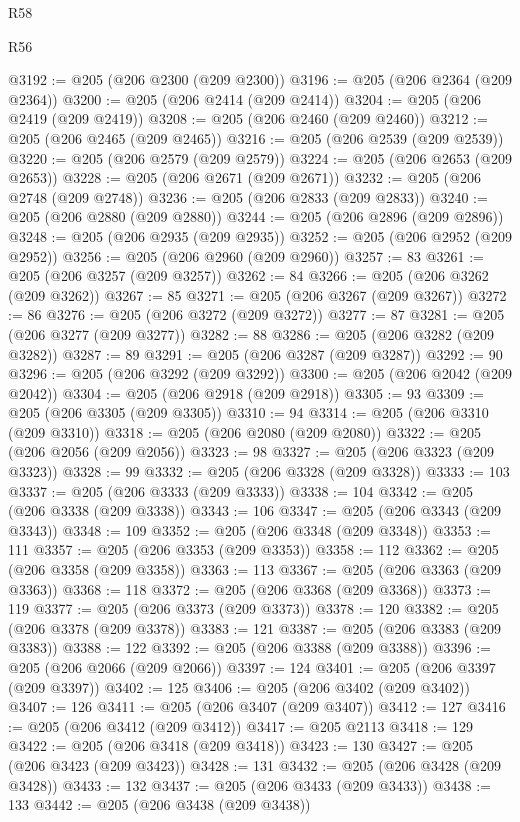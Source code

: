 \begin{lexlean}{R58}
\begin{lexlean}{R56}
\begin{coremodule}
{{{{{{{{{{{{{{{{{{{{{{{{{{{{{{{{{{{{{{{{{{{{{{{{{{{{{{{{{{{{{{{{{{{{{{{{{{{{{{{{{{{{{{{{{{{{{{{{{{{{{{{{{{{{{{{{{{{{{{{{{{{{{{{{{{{{{{{{{{{{{{{{{{{{{{{{{{{{{{{{{{{{{{{{{{{{{{{{{{{{{{{{{{{{{{{{{{{{{{{{{{{{{{{{{{{@3192 := @205 (@206 @2300 (@209 @2300))
@3196 := @205 (@206 @2364 (@209 @2364))
@3200 := @205 (@206 @2414 (@209 @2414))
@3204 := @205 (@206 @2419 (@209 @2419))
@3208 := @205 (@206 @2460 (@209 @2460))
@3212 := @205 (@206 @2465 (@209 @2465))
@3216 := @205 (@206 @2539 (@209 @2539))
@3220 := @205 (@206 @2579 (@209 @2579))
@3224 := @205 (@206 @2653 (@209 @2653))
@3228 := @205 (@206 @2671 (@209 @2671))
@3232 := @205 (@206 @2748 (@209 @2748))
@3236 := @205 (@206 @2833 (@209 @2833))
@3240 := @205 (@206 @2880 (@209 @2880))
@3244 := @205 (@206 @2896 (@209 @2896))
@3248 := @205 (@206 @2935 (@209 @2935))
@3252 := @205 (@206 @2952 (@209 @2952))
@3256 := @205 (@206 @2960 (@209 @2960))
@3257 := 83
@3261 := @205 (@206 @3257 (@209 @3257))
@3262 := 84
@3266 := @205 (@206 @3262 (@209 @3262))
@3267 := 85
@3271 := @205 (@206 @3267 (@209 @3267))
@3272 := 86
@3276 := @205 (@206 @3272 (@209 @3272))
@3277 := 87
@3281 := @205 (@206 @3277 (@209 @3277))
@3282 := 88
@3286 := @205 (@206 @3282 (@209 @3282))
@3287 := 89
@3291 := @205 (@206 @3287 (@209 @3287))
@3292 := 90
@3296 := @205 (@206 @3292 (@209 @3292))
@3300 := @205 (@206 @2042 (@209 @2042))
@3304 := @205 (@206 @2918 (@209 @2918))
@3305 := 93
@3309 := @205 (@206 @3305 (@209 @3305))
@3310 := 94
@3314 := @205 (@206 @3310 (@209 @3310))
@3318 := @205 (@206 @2080 (@209 @2080))
@3322 := @205 (@206 @2056 (@209 @2056))
@3323 := 98
@3327 := @205 (@206 @3323 (@209 @3323))
@3328 := 99
@3332 := @205 (@206 @3328 (@209 @3328))
@3333 := 103
@3337 := @205 (@206 @3333 (@209 @3333))
@3338 := 104
@3342 := @205 (@206 @3338 (@209 @3338))
@3343 := 106
@3347 := @205 (@206 @3343 (@209 @3343))
@3348 := 109
@3352 := @205 (@206 @3348 (@209 @3348))
@3353 := 111
@3357 := @205 (@206 @3353 (@209 @3353))
@3358 := 112
@3362 := @205 (@206 @3358 (@209 @3358))
@3363 := 113
@3367 := @205 (@206 @3363 (@209 @3363))
@3368 := 118
@3372 := @205 (@206 @3368 (@209 @3368))
@3373 := 119
@3377 := @205 (@206 @3373 (@209 @3373))
@3378 := 120
@3382 := @205 (@206 @3378 (@209 @3378))
@3383 := 121
@3387 := @205 (@206 @3383 (@209 @3383))
@3388 := 122
@3392 := @205 (@206 @3388 (@209 @3388))
@3396 := @205 (@206 @2066 (@209 @2066))
@3397 := 124
@3401 := @205 (@206 @3397 (@209 @3397))
@3402 := 125
@3406 := @205 (@206 @3402 (@209 @3402))
@3407 := 126
@3411 := @205 (@206 @3407 (@209 @3407))
@3412 := 127
@3416 := @205 (@206 @3412 (@209 @3412))
@3417 := @205 @2113
@3418 := 129
@3422 := @205 (@206 @3418 (@209 @3418))
@3423 := 130
@3427 := @205 (@206 @3423 (@209 @3423))
@3428 := 131
@3432 := @205 (@206 @3428 (@209 @3428))
@3433 := 132
@3437 := @205 (@206 @3433 (@209 @3433))
@3438 := 133
@3442 := @205 (@206 @3438 (@209 @3438))
}}}}}}}}}}}}}}}}}}}}}}}}}}}}}}}}}}}}}}}}}}}}}}}}}}}}}}}}}}}}}}}}}}}}}}}}}}}}}}}}}}}}}}}}}}}}}}}}}}}}}}}}}}}}}}}}}}}}}}}}}}}}}}}}}}}}}}}}}}}}}}}}}}}}}}}}}}}}}}}}}}}}}}}}}}}}}}}}}}}}}}}}}}}}}}}}}}}}}}}}}}}}}}}}}}}
\end{coremodule}
\end{lexlean}
\end{lexlean}
